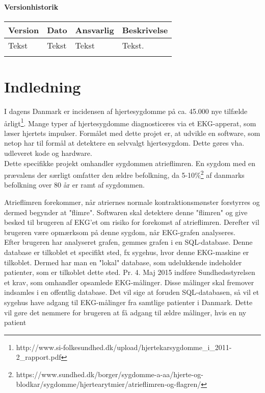 \subsubsection{Versionhistorik}

\begin{longtabu} to 
    Version &    Dato &    Ansvarlig &    Beskrivelse\\[-1ex]
    \midrule
    Tekst &    Tekst &    Tekst &    Tekst.\\
\label{version_Systemark}
\end{longtabu}

\chapter{Indledning}
I dagens Danmark er incidensen af hjertesygdomme på ca. 45.000 nye tilfælde årligt\footnote{http://www.si-folkesundhed.dk/upload/hjertekarsygdomme\_i\_2011-2\_rapport.pdf}. Mange typer af hjertesygdomme diagnosticeres via et EKG-apperat, som læser hjertets impulser. Formålet med dette projet er, at udvikle en software, som netop har til formål at detektere en selvvalgt hjertesygdom. Dette gøres vha. udleveret kode og hardware. \\
Dette specifikke projekt omhandler sygdommen atrieflimren. En sygdom med en  prævalens der særligt omfatter den ældre befolkning, da 5-10\%\footnote{https://www.sundhed.dk/borger/sygdomme-a-aa/hjerte-og-blodkar/sygdomme/hjertearytmier/atrieflimren-og-flagren/} af danmarks befolkning over 80 år er ramt af sygdommen.



Atrieflimren forekommer, når atriernes normale kontraktionsmønster forstyrres og dermed begynder at "flimre". Softwaren skal detektere denne "flimren" og give besked til brugeren af EKG'et om risiko for forekomst af atrieflimren. Derefter vil brugeren være opmærksom på denne sygdom, når EKG-grafen analyseres. \\
Efter brugeren har analyseret grafen, gemmes grafen i en SQL-database. Denne database er tilkoblet et specifikt sted, fx sygehus, hvor denne EKG-maskine er tilkoblet. Dermed har man en "lokal" database, som udelukkende indeholder patienter, som er tilkoblet dette sted.
Pr. 4. Maj 2015 indføre Sundhedsstyrelsen et krav, som omhandler opsamlede EKG-målinger. Disse målinger skal fremover indsamles i en offentlig database. Det vil sige at foruden SQL-databasen, så vil et sygehus have adgang til EKG-målinger fra samtlige patienter i Danmark. Dette vil gøre det nemmere for brugeren at få adgang til ældre målinger, hvis en ny patient   




